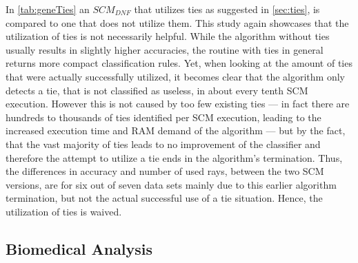 In \autoref{tab:geneTies} an \(SCM_{DNF}\) that utilizes ties as suggested in \autoref{sec:ties}, is compared to one that does not utilize them.
This study again showcases that the utilization of ties is not necessarily helpful.
While the algorithm without ties usually results in slightly higher accuracies, the routine with ties
in general returns more compact classification rules.
Yet, when looking at the amount of ties that were actually successfully utilized,
it becomes clear that the algorithm only detects a tie, that is not classified as useless, in about every tenth SCM execution.
However this is not caused by too few existing ties --- in fact there are hundreds to thousands of ties identified per SCM execution,
leading to the increased execution time and RAM demand of the algorithm ---
but by the fact, that the vast majority of ties leads to no improvement of the classifier and
therefore the attempt to utilize a tie ends in the algorithm's termination.
Thus, the differences in accuracy and number of used rays, between the two SCM versions,
are for six out of seven data sets mainly due to this earlier algorithm termination, but
not the actual successful use of a tie situation.
Hence, the utilization of ties is waived.

\subsection{Biomedical Analysis}

